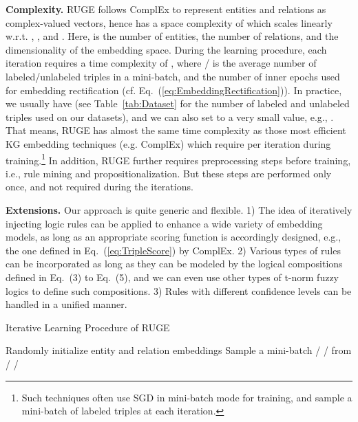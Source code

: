 \documentclass[letterpaper]{article} \usepackage{aaai18}  \usepackage{times}  \usepackage{helvet}  \usepackage{courier}  \usepackage{url}  \usepackage{graphicx}  \usepackage{amsmath}
\begin{document}
\smallskip
\noindent\textbf{Complexity.} RUGE follows ComplEx to represent entities and relations as complex-valued vectors, hence has a space complexity of  which scales linearly w.r.t. , , and . Here,  is the number of entities,  the number of relations, and  the dimensionality of the embedding space. During the learning procedure, each iteration requires a time complexity of , where / is the average number of labeled/unlabeled triples in a mini-batch, and  the number of inner epochs used for embedding rectification (cf. Eq.~(\ref{eq:EmbeddingRectification})). In practice, we usually have  (see Table~\ref{tab:Dataset} for the number of labeled and unlabeled triples used on our datasets), and we can also set  to a very small value, e.g., . That means, RUGE has almost the same time complexity as those most efficient KG embedding techniques (e.g. ComplEx) which require  per iteration during training.\footnote{Such techniques often use SGD in mini-batch mode for training, and sample a mini-batch of  labeled triples at each iteration.} In addition, RUGE further requires preprocessing steps before training, i.e., rule mining and propositionalization. But these steps are performed only once, and not required during the iterations.

\smallskip
\noindent\textbf{Extensions.} Our approach is quite generic and flexible. 1) The idea of iteratively injecting logic rules can be applied to enhance a wide variety of embedding models, as long as an appropriate scoring function is accordingly designed, e.g., the one defined in Eq.~(\ref{eq:TripleScore}) by ComplEx. 2) Various types of rules can be incorporated as long as they can be modeled by the logical compositions defined in Eq.~(3) to Eq.~(5), and we can even use other types of t-norm fuzzy logics to define such compositions. 3) Rules with different confidence levels can be handled in a unified manner.

\begin{algorithm}[t]
\small
\caption{Iterative Learning Procedure of RUGE}\label{alg:RUGE}
\begin{algorithmic}[1]
\STATE Randomly initialize entity and relation embeddings 
\FOR {}
    \STATE Sample a mini-batch  /  /  from  /  / 
\ENDFOR
\ENSURE {}
\end{algorithmic}
\end{algorithm}
\end{document}
